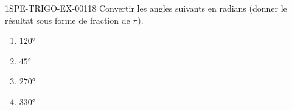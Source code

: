 \begin{exercice}{1SPE-TRIGO-EX-001}{1}{8}
Convertir les angles suivants en radians (donner le résultat sous forme de fraction de $\pi$).
\begin{enumerate}
  \item $120°$
  \item $45°$
  \item $270°$
  \item $330°$
\end{enumerate}
\end{exercice}
